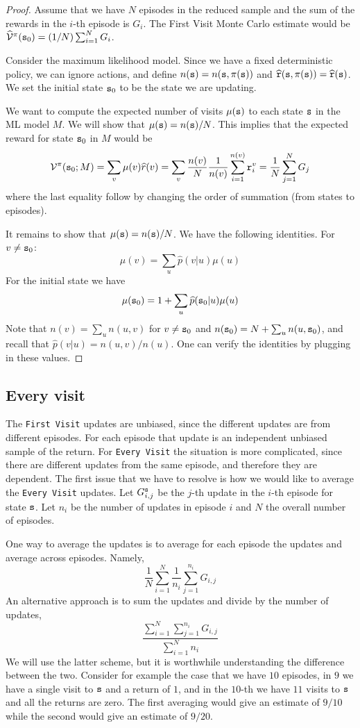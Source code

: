 \begin{proof}
Assume that we have $N$ episodes in the reduced sample and the sum
of the rewards in the $i$-th episode is $G_i$. The First Visit Monte
Carlo estimate would be
$\widehat{\mathcal{V}}^\pi({\tt s}_0)=(1/N)\sum_{i=1}^N G_i$.

Consider the maximum likelihood model. Since we have a fixed
deterministic policy, we can ignore actions, and define
$n({\tt s})=n({\tt s},\pi({\tt s}))$ and
$\widehat{{\tt r}}({\tt s},\pi({\tt s}))=\widehat{{\tt r}}({\tt s})$.
We set the initial state ${\tt s}_0$ to be the state we are updating.

We want to compute the expected number of visits $\mu({\tt s})$ to
each state ${\tt s}$ in the ML model $M$. We will show that
$\mu({\tt s})=n({\tt s})/N$. This implies that the expected reward for
state ${\tt s}_0$ in $M$ would be
\[
\mathcal{V}^\pi({\tt s}_0;M)=\sum_v \mu(v) \widehat{r}(v)=\sum_v
\frac{n(v)}{N}\frac{1}{n(v)}\sum_{i=1}^{n(v)} {\tt r}_i^v =
\frac{1}{N}\sum_{j=1}^N G_j
\]
where the last equality follow by changing the order of summation
(from states to episodes).

It remains to show that $\mu({\tt s})=n({\tt s})/N$. We have the
following identities. For $v\neq {\tt s}_0$:
\[
\mu(v)=\sum_u \widehat{p}(v|u)\mu(u)
\]
For the initial state we have
\[
\mu({\tt s}_0)=1+ \sum_u \widehat{p}({\tt s}_0|u)\mu(u)
\]
Note that $n(v)=\sum_u n(u,v)$ for $v\neq {\tt s}_0$ and
$n({\tt s}_0)=N+\sum_u n(u,{\tt s}_0)$, and recall that
$\widehat{p}(v|u)=n(u,v)/n(u)$. One can verify the identities by
plugging in these values.
\end{proof}

\subsection{Every visit}

The {\tt First Visit} updates are unbiased, since the different
updates are from different episodes. For each episode that update is
an independent unbiased sample of the return.
%
For {\tt Every Visit} the situation is more complicated, since there
are different updates from the same episode, and therefore they are
dependent. The first issue that we have to resolve is how we would like
to average the {\tt Every Visit} updates. Let $G^{\tt s}_{i,j}$
be the $j$-th update in the $i$-th episode for state ${\tt s}$. Let
$n_i$ be the number of updates in episode $i$ and $N$ the overall
number of episodes.

One way to average the updates is to average for each episode the
updates and average across episodes. Namely,
\[
\frac{1}{N}\sum_{i=1}^N \frac{1}{n_i} \sum_{j=1}^{n_i} G_{i,j}
\]
An alternative approach is to sum the updates and divide by the
number of updates,
\[
\frac{\sum_{i=1}^N\sum_{j=1}^{n_i} G_{i,j}}{\sum_{i=1}^N n_i}
\]
We will use the latter scheme, but it is worthwhile understanding
the difference between the two. Consider for example the case that
we have $10$ episodes, in $9$ we have a single visit to ${\tt s}$ and
a return of $1$, and in the $10$-th we have $11$ visits to ${\tt s}$
and all the returns are zero. The first averaging would give an
estimate of $9/10$ while the second would give an estimate of
$9/20$.

